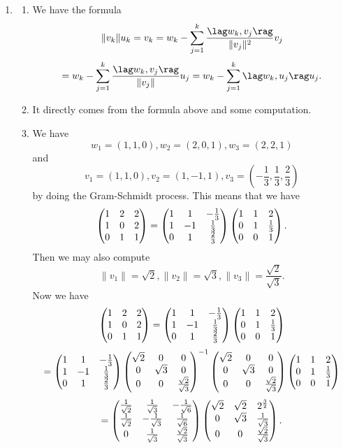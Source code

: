 \begin{enumerate}
\item \begin{enumerate}
\item We have the formula
\[\|v_k\|u_k=v_k=w_k-\sum_{j=1}^k{\frac{\lag w_k,v_j\rag }{\|v_j\|^2}v_j}\]
\[=w_k-\sum_{j=1}^k{\frac{\lag w_k,v_j\rag }{\|v_j\|}u_j}=w_k-\sum_{j=1}^k{\lag w_k,u_j\rag u_j}.\]
\item It directly comes from the formula above and some computation.
\item We have 
\[w_1=(1,1,0),w_2=(2,0,1),w_3=(2,2,1)\]
and 
\[v_1=(1,1,0),v_2=(1,-1,1),v_3=(-\frac{1}{3},\frac{1}{3},\frac{2}{3})\]
by doing the Gram-Schmidt process.
This means that we have 
\[\begin{pmatrix}1 & 2 & 2\cr 1 & 0 & 2\cr 0 & 1 & 1\end{pmatrix}=\begin{pmatrix}1 & 1 & -\frac{1}{3}\cr 1 & -1 & \frac{1}{3}\cr 0 & 1 & \frac{2}{3}\end{pmatrix}\begin{pmatrix}1 & 1 & 2\cr 0 & 1 & \frac{1}{3}\cr 0 & 0 & 1\end{pmatrix}.\]
Then we may also compute 
\[\|v_1\|=\sqrt{2},\|v_2\|=\sqrt{3},\|v_3\|=\frac{\sqrt{2}}{\sqrt{3}}.\]
Now we have 
\[\begin{pmatrix}1 & 2 & 2\cr 1 & 0 & 2\cr 0 & 1 & 1\end{pmatrix}=\begin{pmatrix}1 & 1 & -\frac{1}{3}\cr 1 & -1 & \frac{1}{3}\cr 0 & 1 & \frac{2}{3}\end{pmatrix}\begin{pmatrix}1 & 1 & 2\cr 0 & 1 & \frac{1}{3}\cr 0 & 0 & 1\end{pmatrix}\]
\[=\begin{pmatrix}1 & 1 & -\frac{1}{3}\cr 1 & -1 & \frac{1}{3}\cr 0 & 1 & \frac{2}{3}\end{pmatrix}\begin{pmatrix}\sqrt{2} & 0 & 0\cr 0 & \sqrt{3} & 0\cr 0 & 0 & \frac{\sqrt{2}}{\sqrt{3}}\end{pmatrix}^{-1}\begin{pmatrix}\sqrt{2} & 0 & 0\cr 0 & \sqrt{3} & 0\cr 0 & 0 & \frac{\sqrt{2}}{\sqrt{3}}\end{pmatrix}\begin{pmatrix}1 & 1 & 2\cr 0 & 1 & \frac{1}{3}\cr 0 & 0 & 1\end{pmatrix}\]
\[=\begin{pmatrix}\frac{1}{\sqrt{2}} & \frac{1}{\sqrt{3}} & -\frac{1}{\sqrt{6}}\cr \frac{1}{\sqrt{2}} & -\frac{1}{\sqrt{3}} & \frac{1}{\sqrt{6}}\cr 0 & \frac{1}{\sqrt{3}} & \frac{\sqrt{2}}{\sqrt{3}}\end{pmatrix}\begin{pmatrix}\sqrt{2} & \sqrt{2} & {2}^{\frac{3}{2}}\cr 0 & \sqrt{3} & \frac{1}{\sqrt{3}}\cr 0 & 0 & \frac{\sqrt{2}}{\sqrt{3}}\end{pmatrix}.\]

\end{enumerate}
\end{enumerate}
